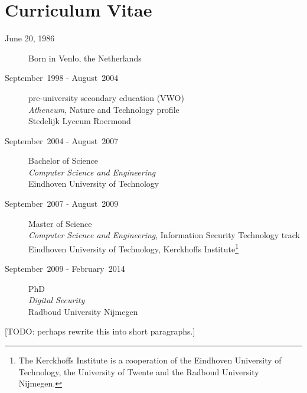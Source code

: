 \chapter*{Curriculum Vitae}

\begin{description}
  \item[June 20, 1986] Born in Venlo, the Netherlands
  \item[September~1998 - August~2004] pre-university secondary education (VWO) \\
    \emph{Atheneum}, Nature and Technology profile \\
    Stedelijk Lyceum Roermond

  \item[September~2004 - August~2007] Bachelor of Science \\
    \emph{Computer Science and Engineering} \\
    Eindhoven University of Technology

  \item[September~2007 - August~2009] Master of Science \\
    \emph{Computer Science and Engineering}, Information Security Technology track \\
    Eindhoven University of Technology, Kerckhoffs Institute\footnote{The Kerckhoffs Institute is a cooperation of the Eindhoven University of Technology, the University of Twente and the Radboud University Nijmegen.}

  \item[September~2009 - February~2014] PhD \\
    \emph{Digital Security} \\
    Radboud University Nijmegen
\end{description}

[TODO: perhaps rewrite this into short paragraphs.]